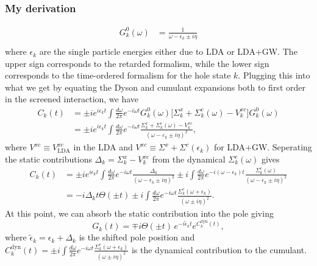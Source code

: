 \subsubsection{My derivation}
\begin{align}
G^{0}_k(\omega) &= \frac{1}{\omega - \epsilon_k \pm i\eta}\\
\end{align}
where $\epsilon_k$ are the single particle energies either due to LDA or LDA+GW. The upper sign corresponds to the retarded formalism, while the lower sign corresponds to the time-ordered formalism for the hole state $k$. Plugging this into what we get by equating the Dyson and cumulant expansions both to first order in the screened interaction, we have
\begin{align}
C_k(t)
&=
\pm i e^{i\epsilon_k t}
\int \frac{d\omega}{2\pi} e^{-i\omega t}
G^{0}_k(\omega)\big[\Sigma_k^{x} + \Sigma_k^{c}(\omega) - V_k^{xc}\big] G^{0}_k(\omega)\\&= \pm i e^{i\epsilon_k t}
\int \frac{d\omega}{2\pi} e^{-i\omega t}
\frac{\Sigma_k^{x} + \Sigma_k^{c}(\omega) - V_k^{xc}}{(\omega - \varepsilon_k \pm i\eta)^2},
\label{eq:Ck_full}
\end{align}
where $V^{xc}\equiv V^{xc}_{\text{LDA}}$ in the LDA and $V^{xc}\equiv \Sigma^x + \Sigma^{c}(\epsilon_k)$ for LDA+GW.
Seperating the static contributions $\Delta_k =\Sigma_k^{x} - V_k^{xc}$ from the dynamical $\Sigma_k^{c}(\omega)$ gives
\begin{align}
    C_k(t) &= \pm i e^{i\epsilon_k t}
\int \frac{d\omega}{2\pi} e^{-i\omega t}
\frac{\Delta_k}{(\omega - \epsilon_k \pm i\eta)^2}
\pm i
\int \frac{d\omega}{2\pi} e^{-i(\omega-\epsilon_k) t}
\frac{\Sigma_k^{c}(\omega)}{(\omega - \epsilon_k \pm i\eta)^2}\\
&= -i \Delta_k t \Theta(\pm t) \pm i
\int \frac{d\omega}{2\pi} e^{-i\omega t}
\frac{\Sigma_k^{c}(\omega + \epsilon_k)}{(\omega \pm i\eta)^2}.
\end{align}
At this point, we can absorb the static contribution into the pole giving 
\begin{equation}
G_k(t) = \mp i\Theta(\pm t)\, e^{-i\tilde{\epsilon}_k t} e^{C_k^{\text{dyn}}(t)},
\end{equation}
where $\tilde{\epsilon}_k = \epsilon_k + \Delta_k$ is the shifted pole position and $C_k^{\text{dyn}}(t) = \pm i \int \frac{d\omega}{2\pi} e^{-i\omega t} \frac{\Sigma_k^{c}(\omega + \epsilon_k)}{(\omega \pm i\eta)^2}$ is the dynamical contribution to the cumulant.
